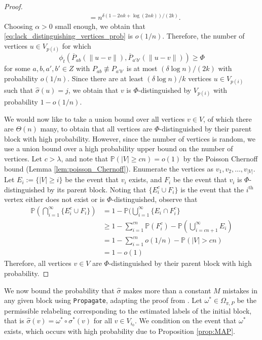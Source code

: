 \documentclass{article}
\renewcommand{\P}{\mathbb{P}}
\newcommand{\1}{\mathbbm{1}}
\theoremstyle{definition}
\theoremstyle{plain}
\begin{document}
\begin{proof}
\begin{align}
        &= n^{\delta (1 - 2\alpha k + \log(2\alpha k)) / (2k) }.
    \end{align}
    Choosing $\alpha > 0$ small enough, we obtain that \eqref{eq:lack_distinguishing_vertices_prob} is $o(1/n)$. Therefore, the number of vertices $u \in V_{p(i)}$ for which 
    \begin{equation*}
        \phi_t(\overline{P}_{ab}(\|u-v\|), \overline{P}_{a'b'}(\|u-v\|)) \geq \Phi
    \end{equation*} 
     for some $a,b,a',b' \in Z$ with $P_{ab} \not \equiv P_{a'b'}$ is at most $(\delta \log n) / (2k)$ with probability $o(1/n)$. Since there are at least $(\delta \log n) / k$ vertices $u \in V_{p(i)}$ such that $\hat{\sigma}(u) = j$, we obtain that $v$ is $\Phi$-distinguished by $V_{p(i)}$ with probability $1 - o(1/n)$.

    We would now like to take a union bound over all vertices $v \in V$, of which there are $\Theta(n)$ many, to obtain that all vertices are $\Phi$-distinguished by their parent block with high probability. However, since the number of vertices is random, we use a union bound over a high probability upper bound on the number of vertices. Let $c > \lambda$, and note that $\P(|V| \geq cn) = o(1)$ by the Poisson Chernoff bound (Lemma \ref{lem:poisson_Chernoff}). Enumerate the vertices as $v_1, v_2, \ldots, v_{|V|}$. Let $E_i := \{|V| \geq i\}$ be the event that $v_i$ exists, and $F_i$ be the event that $v_i$ is $\Phi$-distinguished by its parent block. Noting that $\{E_i^c \cup F_i\}$ is the event that the $i^\text{th}$ vertex either does not exist or is $\Phi$-distinguished, observe that
    \begin{align*}
        \P(\bigcap_{i=1}^\infty \{E_i^c \cup F_i\}) &= 1 - \P(\bigcup_{i=1}^\infty \{E_i \cap F_i^c\} \\
        &\geq 1 - \sum_{i=1}^{cn} \P(F_i^c) - \P(\bigcup_{i=cn+1}^\infty E_i) \\
        &= 1 - \sum_{i=1}^{cn}o(1/n) - \P(|V| > cn) \\
        &= 1 - o(1)
    \end{align*}
    Therefore, all vertices $v \in V$ are $\Phi$-distinguished by their parent block with high probability.
\end{proof}

We now bound the probability that $\hat{\sigma}$ makes more than a constant $M$ mistakes in any given block using \texttt{Propagate}, adapting the proof from \cite{Gaudio+2025}. Let $\omega^* \in \Omega_{\pi, P}$ be the permissible relabeling corresponding to the estimated labels of the initial block, that is $\hat{\sigma}(v) = \omega^* \circ \sigma^*(v)$ for all $v \in V_{i_0}$. We condition on the event that $\omega^*$ exists, which occurs with high probability due to Proposition \ref{prop:MAP}. 
\end{document}

